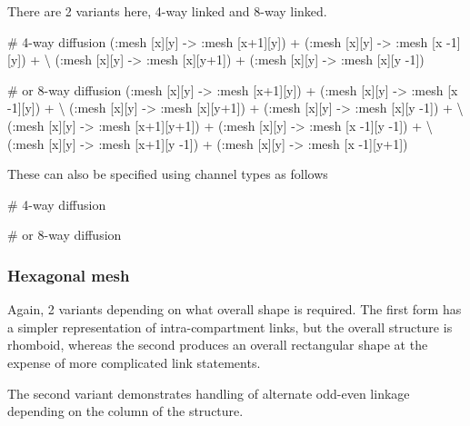 There are 2 variants here, 4-way linked and 8-way linked.

\begin{kappasource}

# 4-way diffusion
    (:mesh [x][y] -> :mesh [x+1][y]) + (:mesh [x][y] -> :mesh [x -1][y]) + {\textbackslash}
    (:mesh [x][y] -> :mesh [x][y+1]) + (:mesh [x][y] -> :mesh [x][y -1])

# or 8-way diffusion
    (:mesh [x][y] -> :mesh [x+1][y]) + (:mesh [x][y] -> :mesh [x -1][y]) + {\textbackslash}
    (:mesh [x][y] -> :mesh [x][y+1]) + (:mesh [x][y] -> :mesh [x][y -1]) + {\textbackslash}
    (:mesh [x][y] -> :mesh [x+1][y+1]) + (:mesh [x][y] -> :mesh [x -1][y -1]) + {\textbackslash}
    (:mesh [x][y] -> :mesh [x+1][y -1]) + (:mesh [x][y] -> :mesh [x -1][y+1])
\end{kappasource}

These can also be specified using channel types as follows

\begin{kappasource}

# 4-way diffusion

# or 8-way diffusion
\end{kappasource}

\subsubsection{Hexagonal mesh}

Again, 2 variants depending on what overall shape is required. The first form has a simpler representation of intra-compartment links, but the overall structure is rhomboid, whereas the second produces an overall rectangular shape at the expense of more complicated link statements.

The second variant demonstrates handling of alternate odd-even linkage depending on the column of the structure.


